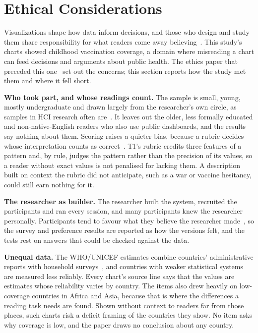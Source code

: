 \documentclass[10pt,twocolumn]{article}
\begin{document}
\section{Ethical Considerations}
\label{sec:ethics}

Visualizations shape how data inform decisions, and those who design and study them share responsibility for what readers come away believing~\cite{correll2019}. This study's charts showed childhood vaccination coverage, a domain where misreading a chart can feed decisions and arguments about public health. The ethics paper that preceded this one~\cite{rebollar2026ethics} set out the concerns; this section reports how the study met them and where it fell short.

\textbf{Who took part, and whose readings count.} The sample is small, young, mostly undergraduate and drawn largely from the researcher's own circle, as samples in HCI research often are~\cite{linxen2021,caine2016}. It leaves out the older, less formally educated and non-native-English readers who also use public dashboards, and the results say nothing about them. Scoring raises a quieter bias, because a rubric decides whose interpretation counts as correct~\cite{quadri2024}. T1's rubric credits three features of a pattern and, by rule, judges the pattern rather than the precision of its values, so a reader without exact values is not penalised for lacking them. A description built on context the rubric did not anticipate, such as a war or vaccine hesitancy, could still earn nothing for it.

\textbf{The researcher as builder.} The researcher built the system, recruited the participants and ran every session, and many participants knew the researcher personally. Participants tend to favour what they believe the researcher made~\cite{dell2012}, so the survey and preference results are reported as how the versions felt, and the tests rest on answers that could be checked against the data.

\textbf{Unequal data.} The WHO/UNICEF estimates combine countries' administrative reports with household surveys~\cite{burton2009}, and countries with weaker statistical systems are measured less reliably. Every chart's source line says that the values are estimates whose reliability varies by country. The items also drew heavily on low-coverage countries in Africa and Asia, because that is where the differences a reading task needs are found. Shown without context to readers far from those places, such charts risk a deficit framing of the countries they show. No item asks why coverage is low, and the paper draws no conclusion about any country.
\end{document}
